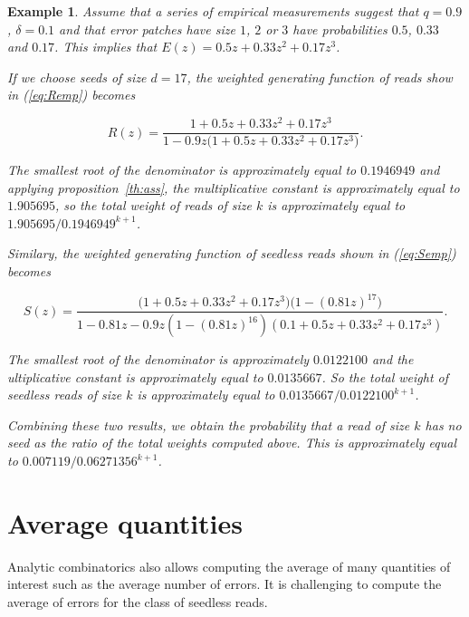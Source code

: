 \documentclass{article}
\newtheorem{example}{Example}
\begin{document}
\begin{example}
Assume that a series of empirical measurements suggest that $q = 0.9$,
$\delta = 0.1$ and that error patches have size $1$, $2$ or $3$ have
probabilities $0.5$, $0.33$ and $0.17$. This implies that $E(z) = 0.5z +
0.33z^2+0.17z^3$.

If we choose seeds of size $d=17$, the weighted generating function of
reads show in (\ref{eq:Remp}) becomes

\begin{equation*}
R(z) = \frac{1+0.5z +0.33z^2+0.17z^3}
{1-0.9z\big(1+0.5z +0.33z^2+0.17z^3\big)}.
\end{equation*}

The smallest root of the denominator is approximately equal to $0.1946949$
and applying proposition~\ref{th:ass}, the multiplicative constant is
approximately equal to $1.905695$, so the total weight of reads of size
$k$ is approximately equal to $1.905695/0.1946949^{k+1}$.

Similary, the weighted generating function of seedless reads shown in
(\ref{eq:Semp}) becomes

\begin{equation*}
S(z) = \frac{\big(1+0.5z +0.33z^2+0.17z^3\big)\big( 1-(0.81z)^{17} \big)}
{1-0.81z-0.9z(1-(0.81z)^{16})(0.1+0.5z +0.33z^2+0.17z^3)}.
\end{equation*}

The smallest root of the denominator is approximately $0.0122100$ and the
ultiplicative constant is approximately equal to $0.0135667$. So the total
weight of seedless reads of size $k$ is approximately equal to $0.0135667
/ 0.0122100^{k+1}$.

Combining these two results, we obtain the probability that a read of size
$k$ has no seed as the ratio of the total weights computed above. This is
approximately equal to $0.007119 / 0.06271356^{k+1}$.
\end{example}








\section{Average quantities}
\label{sec:av}

Analytic combinatorics also allows computing the average of many
quantities of interest such as the average number of errors.  It is
challenging to compute the average of errors for the class of seedless
reads.
\end{document}
